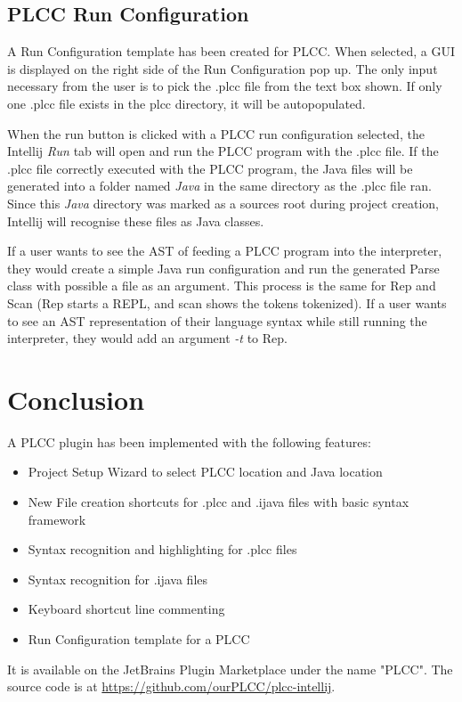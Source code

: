 \documentclass[conference, letterpaper]{IEEEtran}
\begin{document}
\subsection{PLCC Run Configuration}\label{subsec:plcc-run-configuration}
A Run Configuration template has been created for PLCC\@.
When selected, a GUI is displayed on the right side of the Run Configuration pop up.
The only input necessary from the user is to pick the .plcc file from the text box shown.
If only one .plcc file exists in the plcc directory, it will be autopopulated.

When the run button is clicked with a PLCC run configuration selected, the Intellij \textit{Run} tab will open and run the PLCC program with the .plcc file.
If the .plcc file correctly executed with the PLCC program, the Java files will be generated into a folder named \textit{Java} in the same directory as the .plcc file ran.
Since this \textit{Java} directory was marked as a sources root during project creation, Intellij will recognise these files as Java classes.

If a user wants to see the AST of feeding a PLCC program into the interpreter, they would create a simple Java run configuration and run the generated Parse class with possible a file as an argument.
This process is the same for Rep and Scan (Rep starts a REPL, and scan shows the tokens tokenized).
If a user wants to see an AST representation of their language syntax while still running the interpreter, they would add an argument \textit{-t} to Rep.


\section{Conclusion}\label{sec:conclusion}
A PLCC plugin has been implemented with the following features:
\begin{itemize}
    \item Project Setup Wizard to select PLCC location and Java location
    \item New File creation shortcuts for .plcc and .ijava files with basic syntax framework
    \item Syntax recognition and highlighting for .plcc files
    \item Syntax recognition for .ijava files
    \item Keyboard shortcut line commenting
    \item Run Configuration template for a PLCC
\end{itemize}
It is available on the JetBrains Plugin Marketplace under the name "PLCC".
The source code is at \href{https://github.com/ourPLCC/plcc-intellij}{https://github.com/ourPLCC/plcc-intellij}.
\end{document}
